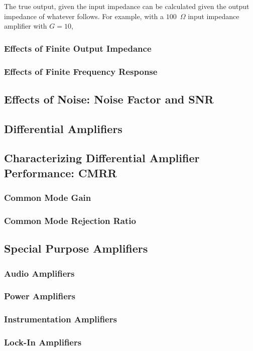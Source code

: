 \documentclass[]{article}
\begin{document}
The true output, given the input impedance can be calculated given the output impedance of whatever follows. For example, with a $100$~$\Omega$ input impedance amplifier with $G = 10$, 

\subsubsection{Effects of Finite Output Impedance}

\subsubsection{Effects of Finite Frequency Response}

\subsection{Effects of Noise: Noise Factor and SNR}

\subsection{Differential Amplifiers}

\subsection{Characterizing Differential Amplifier Performance: CMRR}
\subsubsection{Common Mode Gain}
\subsubsection{Common Mode Rejection Ratio}
\subsection{Special Purpose Amplifiers}
\subsubsection{Audio Amplifiers}
\subsubsection{Power Amplifiers}
\subsubsection{Instrumentation Amplifiers}
\subsubsection{Lock-In Amplifiers}
\end{document}

